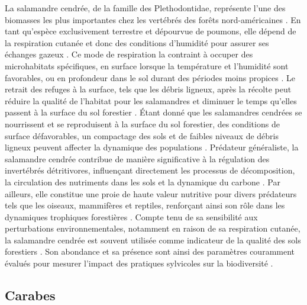 La salamandre cendrée, de la famille des Plethodontidae, représente l'une des biomasses les plus importantes chez les vertébrés des forêts nord-américaines \citep{Burton1975Salamanderpopulations,Petranka1993Effectstimber,semlitschAbundanceBiomassProduction2014a}. 
En tant qu'espèce exclusivement terrestre et dépourvue de poumons, elle dépend de la respiration cutanée et donc des conditions d'humidité pour assurer ses échanges gazeux \citep{Heatwole1961Relationsubstrate}. 
Ce mode de respiration la contraint à occuper des microhabitats spécifiques, en surface lorsque la température et l'humidité sont favorables, ou en profondeur dans le sol durant des périodes moins propices \citep{Grizzell1949HibernationSite,FraserEmpiricalEvaluation1976,Jaeger1980MicrohabitatsTerrestrial}. 
Le retrait des refuges à la surface, tels que les débris ligneux, après la récolte peut réduire la qualité de l'habitat pour les salamandres et diminuer le temps qu'elles passent à la surface du sol forestier \citep{Achat2015Quantifyingconsequences,Peele2017EffectsWoody}. 
Étant donné que les salamandres cendrées se nourrissent et se reproduisent à la surface du sol forestier, des conditions de surface défavorables, un compactage des sols et de faibles niveaux de débris ligneux peuvent affecter la dynamique des populations \citep{Peterman2014Spatialvariation}. 
Prédateur généraliste, la salamandre cendrée contribue de manière significative à la régulation des invertébrés détritivores, influençant directement les processus de décomposition, la circulation des nutriments dans les sols et la dynamique du carbone \citep{Burton1975Energyflow,Wyman1998Experimentalassessment,Walton2013Topdownregulation,Hickerson2017Easternredbacked}. 
Par ailleurs, elle constitue une proie de haute valeur nutritive pour divers prédateurs tels que les oiseaux, mammifères et reptiles, renforçant ainsi son rôle dans les dynamiques trophiques forestières \citep{Burton1975Energyflow,Pough1987abundancesalamanders}. 
Compte tenu de sa sensibilité aux perturbations environnementales, notamment en raison de sa respiration cutanée, la salamandre cendrée est souvent utilisée comme indicateur de la qualité des sols forestiers \citep{Welsh2001caseusing}. 
Son abondance et sa présence sont ainsi des paramètres couramment évalués pour mesurer l'impact des pratiques sylvicoles sur la biodiversité \citep{Harpole1999Effectsseven,Grialou2000effectsforest,Homyack2009Longtermeffects,Hocking2013Effectsexperimental,Mazerolle2021Woodlandsalamander}. 

\subsection*{Carabes}

